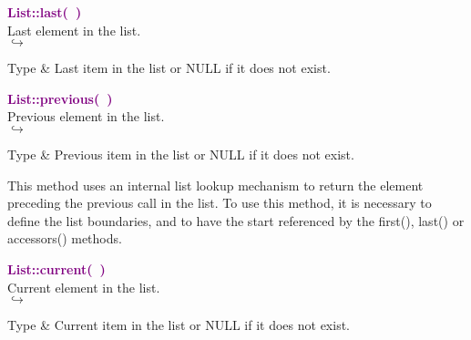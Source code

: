 
\textcolor{purple}{\textbf{List::last(~)}}\label{List::last()}\\
Last element in the list.\\ \hspace*{5mm}$\hookrightarrow$
\vspace*{-2em}\begin{tcolorbox}[grow to left by=-1cm, width=\textwidth-1cm,myArgs,tabularx={l|R}]
Type & Last item in the list or NULL if it does not exist.
\end{tcolorbox}


\textcolor{purple}{\textbf{List::previous(~)}}\label{List::previous()}\\
Previous element in the list.\\ \hspace*{5mm}$\hookrightarrow$
\vspace*{-2em}\begin{tcolorbox}[grow to left by=-1cm, width=\textwidth-1cm,myArgs,tabularx={l|R}]
Type & Previous item in the list or NULL if it does not exist.
\end{tcolorbox}

This method uses an internal list lookup mechanism to return the element preceding the previous call in the list.
To use this method, it is necessary to define the list boundaries, and to have the start referenced by the first(), last() or accessors() methods.

\textcolor{purple}{\textbf{List::current(~)}}\label{List::current()}\\
Current element in the list.\\ \hspace*{5mm}$\hookrightarrow$
\vspace*{-2em}\begin{tcolorbox}[grow to left by=-1cm, width=\textwidth-1cm,myArgs,tabularx={l|R}]
Type & Current item in the list or NULL if it does not exist.
\end{tcolorbox}

